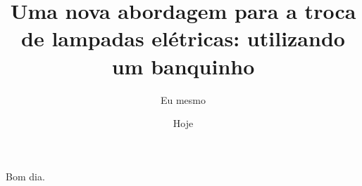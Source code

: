 \documentclass{article}
\author{Eu mesmo}
\date{Hoje}
\title{Uma nova abordagem para a troca de
       lampadas elétricas: utilizando um banquinho}
\begin{document}
\maketitle

Bom dia.
\end{document}
